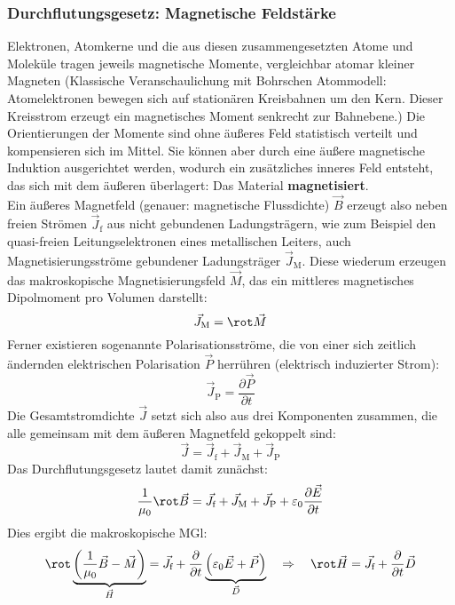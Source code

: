 \subsubsection{Durchflutungsgesetz: Magnetische Feldstärke}\label{durchfmat}
 Elektronen, Atomkerne und die aus diesen zusammengesetzten Atome und Moleküle tragen jeweils magnetische Momente, vergleichbar atomar kleiner Magneten (Klassische Veranschaulichung mit Bohrschen Atommodell: Atomelektronen bewegen sich auf stationären Kreisbahnen um den Kern. Dieser Kreisstrom erzeugt ein magnetisches Moment senkrecht zur Bahnebene.) Die Orientierungen der Momente sind ohne äußeres Feld statistisch verteilt und kompensieren sich im Mittel. Sie können aber durch eine äußere magnetische Induktion ausgerichtet werden, wodurch ein zusätzliches inneres Feld entsteht, das sich mit dem äußeren überlagert: Das Material \textbf{magnetisiert}.\\
 Ein äußeres Magnetfeld (genauer: magnetische Flussdichte) $\vec{B}$ erzeugt also neben freien Strömen $\vec{J}_{\text{f}}$ aus nicht gebundenen Ladungsträgern, wie zum Beispiel den quasi-freien Leitungselektronen eines metallischen Leiters, auch Magnetisierungsströme gebundener Ladungsträger $\vec{J}_{\text{M}}$. Diese wiederum erzeugen das makroskopische Magnetisierungsfeld $\vec{M}$, das ein mittleres magnetisches Dipolmoment pro Volumen darstellt:
 \begin{equation}
 	\vec{J}_{\text{M}}=\rot \vec{M}
 \end{equation}
 Ferner existieren sogenannte Polarisationsströme, die von einer sich zeitlich ändernden elektrischen Polarisation $\vec{P}$ herrühren (elektrisch induzierter Strom):
 \begin{equation}
 	\vec{J}_{\text{P}}=\frac{\partial \vec{P}}{\partial t}
 \end{equation}
 Die Gesamtstromdichte $\vec{J}$ setzt sich also aus drei Komponenten zusammen, die alle gemeinsam mit dem äußeren Magnetfeld gekoppelt sind:
 \begin{equation}\vec{J}=\vec{J}_{\text{f}}+\vec{J}_{\text{M}}+\vec{J}_{\text{P}}\end{equation}
 Das Durchflutungsgesetz lautet damit zunächst:
 \begin{equation}\frac{1}{\mu_0}\rot \vec{B}=\vec{J}_{\text{f}}+\vec{J}_{\text{M}}+\vec{J}_{\text{P}}+\varepsilon_0\frac{\partial \vec{E}}{\partial t}\end{equation}
 Dies ergibt die makroskopische MGl:
 \begin{equation}\rot \underbrace{\left( \frac{1}{\mu_0}\vec{B}-\vec{M} \right)}_{{\vec{H}}}=\vec{J}_{\text{f}}+\frac{\partial }{\partial t}\underbrace{\left( \varepsilon_0\vec{E}+\vec{P} \right)}_{{\vec{D}}}
 	\quad\Rightarrow\quad
 	\rot \vec{H}=\vec{J}_{\text{f}}+\frac{\partial }{\partial t}\vec{D}
 \end{equation}
